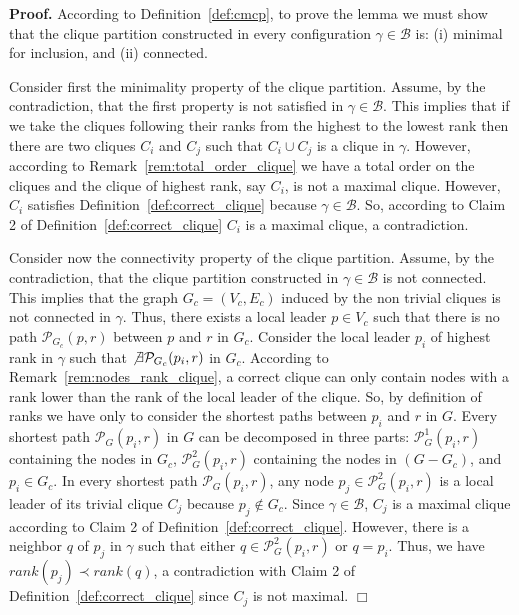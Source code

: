 \documentclass[11pt,letterpaper,onecolumn]{article}
\newenvironment{proof}{\noindent \begin{rm}{\textbf{Proof.} }}{\hspace*{\fill}$\Box$\par\end{rm} \vspace{.3cm}}
\begin{document}
\begin{proof}
According to Definition~\ref{def:cmcp}, to prove the lemma we must show that the clique partition constructed in every configuration $\gamma \in \mathcal{B}$ is: (i) minimal for inclusion, and (ii) connected.

Consider first the minimality property of the clique partition. Assume, by the contradiction, that the first property is not satisfied in $\gamma \in \mathcal{B}$. This implies that if we take the cliques following their ranks from the highest to the lowest rank then there are two cliques $C_i$ and $C_j$ such that $C_i \cup C_j$ is a clique in $\gamma$. However, according to Remark~\ref{rem:total_order_clique} we have a total order on the cliques and the clique of highest rank, say $C_i$, is not a maximal clique. However, $C_i$ satisfies Definition~\ref{def:correct_clique} because $\gamma \in \mathcal{B}$. So, according to Claim 2 of Definition~\ref{def:correct_clique} $C_i$ is a maximal clique, a contradiction.

Consider now the connectivity property of the clique partition. Assume, by the contradiction, that the clique partition constructed in $\gamma \in \mathcal{B}$ is not connected. This implies that the graph $G_c=(V_c, E_c)$ induced by the non trivial cliques is not connected in $\gamma$. Thus, there exists a local leader $p \in V_c$ such that there is no path $\mathcal{P}_{G_c}(p, r)$ between $p$ and $r$ in $G_c$. Consider the local leader $p_i$ of highest rank in $\gamma$ such that $\not \exists \mathcal{P}_{G_c}(p_i, r)$ in $G_c$. According to Remark~\ref{rem:nodes_rank_clique}, a correct clique can only contain nodes with a rank lower than the rank of the local leader of the clique. So, by definition of ranks we have only to consider the shortest paths between $p_i$ and $r$ in $G$. Every shortest path $\mathcal{P}_G(p_i,r)$ in $G$ can be decomposed in three parts: $\mathcal{P}_G^1(p_i,r)$ containing the nodes in $G_c$, $\mathcal{P}_G^2(p_i,r)$ containing the nodes in $(G - G_c)$, and $p_i \in G_c$. In every shortest path $\mathcal{P}_G(p_i,r)$, any node $p_j \in \mathcal{P}_G^2(p_i,r)$ is a local leader of its trivial clique $C_j$ because $p_j \not \in G_c$. Since $\gamma \in \mathcal{B}$, $C_j$ is a maximal clique according to Claim 2 of Definition~\ref{def:correct_clique}. However, there is a neighbor $q$ of $p_j$ in $\gamma$ such that either $q \in \mathcal{P}_G^2(p_i,r)$ or $q=p_i$. Thus, we have $rank(p_j) \prec rank(q)$, a contradiction with Claim 2 of Definition~\ref{def:correct_clique} since $C_j$ is not maximal.
\end{proof}
\end{document}
